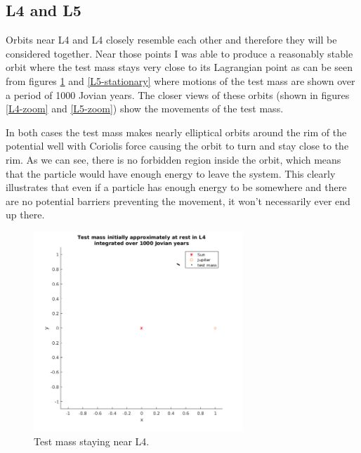 \documentclass[12pt,a4paper,titlepage]{article}
\begin{document}
\subsection{L4 and L5}
Orbits near L4 and L4 closely resemble each other and therefore they will be considered together. Near those points I was able to produce a reasonably stable orbit where the test mass stays very close to its Lagrangian point as can be seen from figures \ref{L4-stationary} and \ref{L5-stationary} where motions of the test mass are shown over a period of 1000 Jovian years. The closer views of these orbits (shown in figures \ref{L4-zoom} and \ref{L5-zoom}) show the movements of the test mass.

In both cases the test mass makes nearly elliptical orbits around the rim of the potential well with Coriolis force causing the orbit to turn and stay close to the rim. As we can see, there is no forbidden region inside the orbit, which means that the particle would have enough energy to leave the system. This clearly illustrates that even if a particle has enough energy to be somewhere and there are no potential barriers preventing the movement, it won't necessarily ever end up there.

\begin{figure}
\centering
\includegraphics[width=0.7\textwidth]{../plots/L4-stationary.png}
\caption{Test mass staying near L4.}
\label{L4-stationary}
\end{figure}
\end{document}
